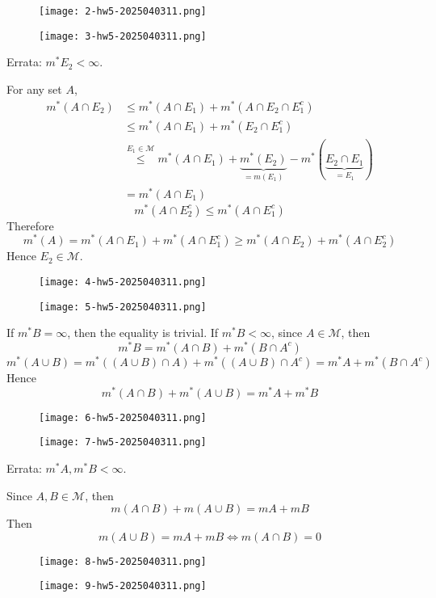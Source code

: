 \begin{figure}[H]
\centering
\texttt{[image: 2-hw5-2025040311.png]}
\label{}
\end{figure}
\begin{figure}[H]
\centering
\texttt{[image: 3-hw5-2025040311.png]}
\label{}
\end{figure}

Errata: $m^{*}E_2<\infty$.

For any set $A$,
\[
\begin{aligned}
m^{*}(A\cap E_2) & \leq  m^{*}(A\cap E_1)+m^{*}(A\cap E_2\cap E_1^{c}) \\
 & \leq m^{*}(A\cap E_1)+m^{*}(E_2\cap E_1^{c}) \\
 & \overset{ E_1\in \mathcal{M} }{ \leq  } m^{*}(A\cap E_1)+\underbrace{ m^{*}(E_2) }_{ =m(E_1) }-m^{*}(\underbrace{ E_2\cap E_1 }_{ =E_1 }) \\
 & =m^{*}(A\cap E_1)
\end{aligned}
\]
\[
m^{*}(A\cap E_2^{c})\leq m^{*}(A\cap E_1^{c})
\]
Therefore
\[
m^{*}(A)=m^{*}(A\cap E_1)+m^{*}(A\cap E_1^{c})\geq m^{*}(A\cap E_2)+m^{*}(A\cap E_2^{c})
\]
Hence $E_2\in \mathcal{M}$.

\begin{figure}[H]
\centering
\texttt{[image: 4-hw5-2025040311.png]}
\label{}
\end{figure}
\begin{figure}[H]
\centering
\texttt{[image: 5-hw5-2025040311.png]}
\label{}
\end{figure}

If $m^{*}B=\infty$, then the equality is trivial. If $m^{*}B<\infty$, since $A\in \mathcal{M}$, then
\[
m^{*}B=m^{*}(A\cap B)+m^{*}(B\cap A^{c})
\]
\[
m^{*}(A\cup B)=m^{*}((A\cup B)\cap A)+m^{*}((A\cup B)\cap A^{c})=m^{*}A+m^{*}(B\cap A^{c})
\]
Hence
\[
m^{*}(A\cap B)+m^{*}(A\cup B)=m^{*}A+m^{*}B
\]
\begin{figure}[H]
\centering
\texttt{[image: 6-hw5-2025040311.png]}
\label{}
\end{figure}
\begin{figure}[H]
\centering
\texttt{[image: 7-hw5-2025040311.png]}
\label{}
\end{figure}

Errata: $m^{*}A,m^{*}B<\infty$.

Since $A, B\in \mathcal{M}$, then
\[
m(A\cap B)+m(A\cup B)=mA+mB
\]
Then
\[
m(A\cup B)=mA+mB\iff m(A\cap B)=0
\]
\begin{figure}[H]
\centering
\texttt{[image: 8-hw5-2025040311.png]}
\label{}
\end{figure}
\begin{figure}[H]
\centering
\texttt{[image: 9-hw5-2025040311.png]}
\label{}
\end{figure}


